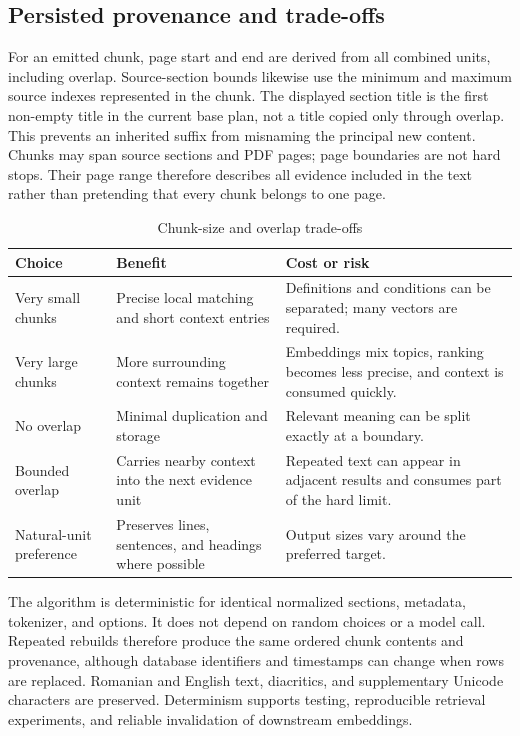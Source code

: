 \subsection{Persisted provenance and trade-offs}

For an emitted chunk, page start and end are derived from all combined units,
including overlap. Source-section bounds likewise use the minimum and maximum
source indexes represented in the chunk. The displayed section title is the
first non-empty title in the current base plan, not a title copied only through
overlap. This prevents an inherited suffix from misnaming the principal new
content. Chunks may span source sections and PDF pages; page boundaries are not
hard stops. Their page range therefore describes all evidence included in the
text rather than pretending that every chunk belongs to one page.

\begin{table}[!htbp]
	\centering
	\small
	\caption{Chunk-size and overlap trade-offs}
	\label{tab:chunking-tradeoffs}
	\begin{tabular}{p{3.1cm}p{4.7cm}p{4.7cm}}
		\toprule
		Choice & Benefit & Cost or risk \\
		\midrule
		Very small chunks & Precise local matching and short context entries & Definitions and conditions can be separated; many vectors are required. \\
		Very large chunks & More surrounding context remains together & Embeddings mix topics, ranking becomes less precise, and context is consumed quickly. \\
		No overlap & Minimal duplication and storage & Relevant meaning can be split exactly at a boundary. \\
		Bounded overlap & Carries nearby context into the next evidence unit & Repeated text can appear in adjacent results and consumes part of the hard limit. \\
		Natural-unit preference & Preserves lines, sentences, and headings where possible & Output sizes vary around the preferred target. \\
		\bottomrule
	\end{tabular}
\end{table}

The algorithm is deterministic for identical normalized sections, metadata,
tokenizer, and options. It does not depend on random choices or a model call.
Repeated rebuilds therefore produce the same ordered chunk contents and
provenance, although database identifiers and timestamps can change when rows
are replaced. Romanian and English text, diacritics, and supplementary Unicode
characters are preserved. Determinism supports testing, reproducible retrieval
experiments, and reliable invalidation of downstream embeddings.


